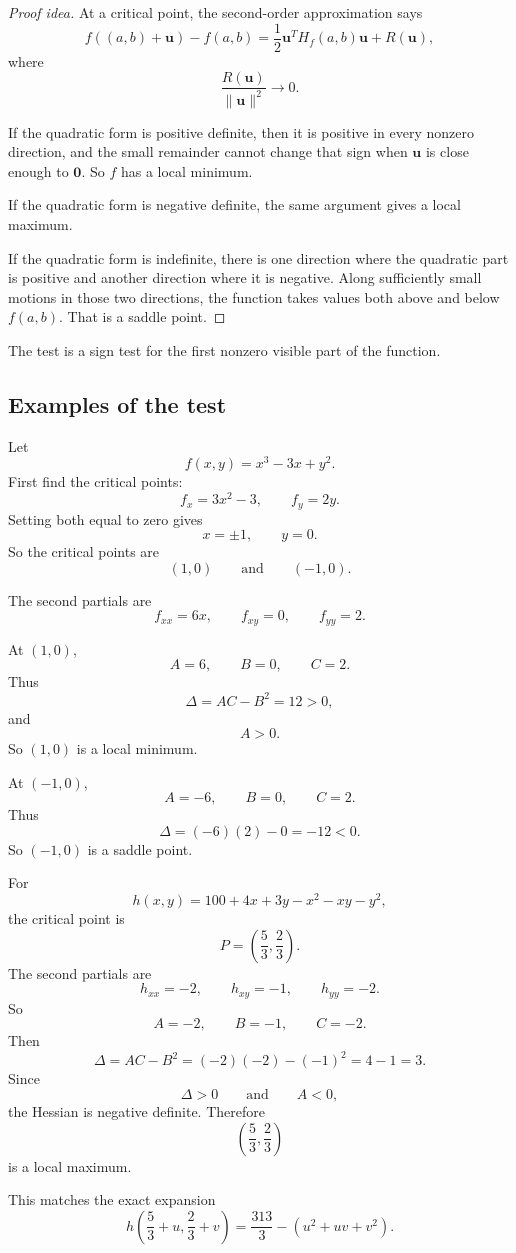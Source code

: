 \begin{proof}[Proof idea]
At a critical point, the second-order approximation says
\[
    f((a,b)+\mathbf u)-f(a,b)
    =
    \frac12\mathbf u^T H_f(a,b)\mathbf u
    +
    R(\mathbf u),
\]
where
\[
    \frac{R(\mathbf u)}{\|\mathbf u\|^2}\to0.
\]

If the quadratic form is positive definite, then it is positive in every nonzero
direction, and the small remainder cannot change that sign when \(\mathbf u\) is close
enough to \(\mathbf 0\).  So \(f\) has a local minimum.

If the quadratic form is negative definite, the same argument gives a local maximum.

If the quadratic form is indefinite, there is one direction where the quadratic part is
positive and another direction where it is negative.  Along sufficiently small motions in
those two directions, the function takes values both above and below \(f(a,b)\).  That
is a saddle point.
\end{proof}

The test is a sign test for the first nonzero visible part of the function.

\subsection{Examples of the test}

\begin{example}
Let
\[
    f(x,y)=x^3-3x+y^2.
\]
First find the critical points:
\[
    f_x=3x^2-3,
    \qquad
    f_y=2y.
\]
Setting both equal to zero gives
\[
    x=\pm1,
    \qquad
    y=0.
\]
So the critical points are
\[
    (1,0)
    \qquad\text{and}\qquad
    (-1,0).
\]

The second partials are
\[
    f_{xx}=6x,
    \qquad
    f_{xy}=0,
    \qquad
    f_{yy}=2.
\]

At \((1,0)\),
\[
    A=6,
    \qquad
    B=0,
    \qquad
    C=2.
\]
Thus
\[
    \Delta=AC-B^2=12>0,
\]
and
\[
    A>0.
\]
So \((1,0)\) is a local minimum.

At \((-1,0)\),
\[
    A=-6,
    \qquad
    B=0,
    \qquad
    C=2.
\]
Thus
\[
    \Delta=(-6)(2)-0=-12<0.
\]
So \((-1,0)\) is a saddle point.
\end{example}

\begin{example}
For
\[
    h(x,y)=100+4x+3y-x^2-xy-y^2,
\]
the critical point is
\[
    P=\left(\frac53,\frac23\right).
\]
The second partials are
\[
    h_{xx}=-2,
    \qquad
    h_{xy}=-1,
    \qquad
    h_{yy}=-2.
\]
So
\[
    A=-2,
    \qquad
    B=-1,
    \qquad
    C=-2.
\]
Then
\[
    \Delta=AC-B^2=(-2)(-2)-(-1)^2=4-1=3.
\]
Since
\[
    \Delta>0
    \qquad\text{and}\qquad
    A<0,
\]
the Hessian is negative definite.  Therefore
\[
    \left(\frac53,\frac23\right)
\]
is a local maximum.

This matches the exact expansion
\[
    h\left(\frac53+u,\frac23+v\right)
    =
    \frac{313}{3}-(u^2+uv+v^2).
\]
\end{example}

